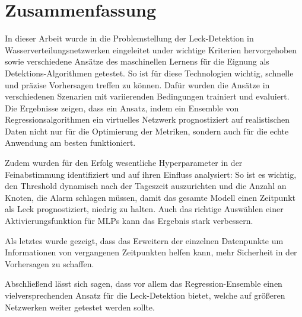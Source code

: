 \chapter{Zusammenfassung}

In dieser Arbeit wurde in die Problemstellung der Leck-Detektion in Wasserverteilungsnetzwerken eingeleitet under
 wichtige Kriterien hervorgehoben sowie verschiedene Ansätze des maschinellen Lernens für die Eignung als
 Detektions-Algorithmen getestet. So ist für diese Technologien wichtig, schnelle und präzise Vorhersagen
 treffen zu können. Dafür wurden die Ansätze in verschiedenen Szenarien mit variierenden Bedingungen trainiert
 und evaluiert. Die Ergebnisse zeigen, dass ein Ansatz, indem ein Ensemble von Regressionsalgorithmen ein
 virtuelles Netzwerk prognostiziert auf realistischen Daten nicht nur für die Optimierung der Metriken, sondern
 auch für die echte Anwendung am besten funktioniert.

Zudem wurden für den Erfolg wesentliche Hyperparameter in der Feinabstimmung identifiziert und auf ihren Einfluss
 analysiert: So ist es wichtig, den Threshold dynamisch nach der Tageszeit auszurichten und die Anzahl an Knoten,
 die Alarm schlagen müssen, damit das gesamte Modell einen Zeitpunkt als Leck prognostiziert, niedrig zu halten.
 Auch das richtige Auswählen einer Aktivierungsfunktion für MLPs kann das Ergebnis stark verbessern.

Als letztes wurde gezeigt, dass das Erweitern der einzelnen Datenpunkte um Informationen von vergangenen
Zeitpunkten helfen kann, mehr Sicherheit in der Vorhersagen zu schaffen.

Abschließend lässt sich sagen, dass vor allem das Regression-Ensemble einen vielversprechenden Ansatz für die
Leck-Detektion bietet, welche auf größeren Netzwerken weiter getestet werden sollte.
